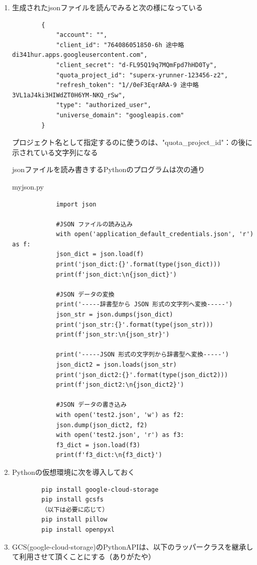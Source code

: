 \documentclass[12pt,a4paper,uplatex]{jsbook}
\begin{document}
\begin{enumerate}
	\item 生成されたjsonファイルを読んでみると次の様になっている
	\begin{verbatim}
		{
			"account": "",
			"client_id": "764086051850-6h 途中略 di341hur.apps.googleusercontent.com",
			"client_secret": "d-FL95Q19q7MQmFpd7hHD0Ty",
			"quota_project_id": "superx-yrunner-123456-z2",
			"refresh_token": "1//0eF3EqrARA-9 途中略 3VL1aJ4ki3HIWdZT0H6YM-NKQ_rSw",
			"type": "authorized_user",
			"universe_domain": "googleapis.com"
		}
	\end{verbatim}
	プロジェクト名として指定するのに使うのは、"quota\_project\_id"：の後に示されている文字列になる
	
	jsonファイルを読み書きするPythonのプログラムは次の通り
	\begin{itembox}[l]{myjson.py}
		\begin{verbatim}
			import json
			
			#JSON ファイルの読み込み
			with open('application_default_credentials.json', 'r') as f:
			json_dict = json.load(f)
			print('json_dict:{}'.format(type(json_dict)))
			print(f'json_dict:\n{json_dict}')
			
			#JSON データの変換
			print('-----辞書型から JSON 形式の文字列へ変換-----')
			json_str = json.dumps(json_dict)
			print('json_str:{}'.format(type(json_str)))
			print(f'json_str:\n{json_str}')
			
			print('-----JSON 形式の文字列から辞書型へ変換-----')
			json_dict2 = json.loads(json_str)
			print('json_dict2:{}'.format(type(json_dict2)))
			print(f'json_dict2:\n{json_dict2}')
			
			#JSON データの書き込み
			with open('test2.json', 'w') as f2:
			json.dump(json_dict2, f2)
			with open('test2.json', 'r') as f3:
			f3_dict = json.load(f3)
			print(f'f3_dict:\n{f3_dict}')
		\end{verbatim}
	\end{itembox}
	
	\item Pythonの仮想環境に次を導入しておく
	\begin{verbatim}
		pip install google-cloud-storage
		pip install gcsfs
		（以下は必要に応じて）
		pip install pillow
		pip install openpyxl
	\end{verbatim}
	
	\item GCS(google-cloud-storage)のPythonAPIは、以下のラッパークラス\footnotemark[7]を継承して利用させて頂くことにする（ありがたや）
	
	\setcounter{footnote}{7}
	
\end{enumerate}
\end{document}
